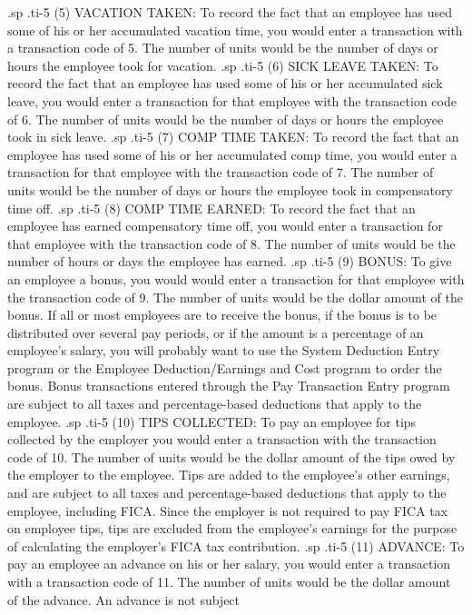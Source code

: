 .sp
.ti-5
(5)  VACATION TAKEN: To record the fact that an employee has used
some of his or her accumulated vacation time, you would enter
a transaction with a transaction code of 5. The number of units
would be the number of days or hours the employee took for vacation.
.sp
.ti-5
(6)  SICK LEAVE TAKEN:	To record the fact that an employee has used
some of his or her accumulated sick leave, you would enter a
transaction for that employee with the transaction code of 6.  The
number of units would be the number of days or hours the employee
took in sick leave.
.sp
.ti-5
(7)  COMP TIME TAKEN: To record the fact that an employee has used
some of his or her accumulated comp time, you would enter a
transaction for that employee with the transaction code of 7.  The
number of units would be the number of days or hours the employee
took in compensatory time off.
.sp
.ti-5
(8)  COMP TIME EARNED: To record the fact that an employee has
earned compensatory time off, you would enter a transaction for
that employee with the transaction code of 8.  The number of units
would be the number of hours or days the employee has earned.
.sp
.ti-5
(9)  BONUS: To give an employee a bonus, you would would
enter a transaction for that employee with the transaction code of
9.  The number of units would be the dollar amount of the bonus.
If all or most employees are to receive the bonus, if the bonus is to be
distributed over several pay periods, or if the amount is a
percentage of an employee's salary, you will probably want to use the
System Deduction Entry program or the Employee Deduction/Earnings and
Cost program to order the bonus.  Bonus transactions entered through
the Pay Transaction Entry program are subject to all taxes and
percentage-based deductions
that apply to the employee.
.sp
.ti-5
(10) TIPS COLLECTED: To pay an employee for tips collected by the employer
you would enter a transaction with the transaction code of 10. The
number of units would be the dollar amount of the tips owed by the employer
to the employee.  Tips are added to the employee's other earnings, and are
subject to all taxes and percentage-based
deductions that apply to the employee, including
FICA.  Since the employer is not required to pay FICA tax on employee
tips, tips are excluded from the employee's earnings for the purpose of
calculating the employer's FICA tax contribution.
.sp
.ti-5
(11) ADVANCE: To pay an employee an advance on his or her salary, you would
enter a transaction with a transaction code of 11.  The number of units
would be the dollar amount of the advance.  An advance is not subject
